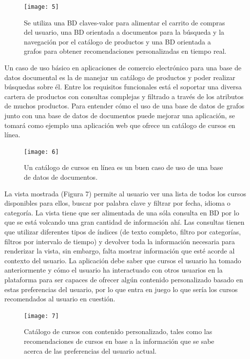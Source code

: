\documentclass[conference]{IEEEtran}
\begin{document}
\begin{figure}[!h]
\centering
\texttt{[image: 5]}
\caption{Se utiliza una BD claves-valor para alimentar el carrito de compras del usuario, una BD orientada a  documentos para la b\'usqueda y la navegaci\'on por el cat\'alogo de productos y una BD orientada a grafos para obtener recomendaciones personalizadas en tiempo real.}
\label{fig5}
\end{figure}

Un caso de uso b\'asico en aplicaciones de comercio electr\'onico para una base de datos documental es la de manejar un cat\'alogo de productos y poder realizar b\'usquedas sobre \'el. Entre los requisitos funcionales está el soportar una diversa cartera de productos con consultas complejas y filtrado a trav\'es de los atributos de muchos productos. Para entender c\'omo el uso de una base de datos de grafos  junto con una base de datos de documentos puede mejorar una aplicaci\'on, se tomar\'a como ejemplo una aplicaci\'on web que ofrece un cat\'alogo de cursos en l\'inea.

\begin{figure}[!h]
\centering
\texttt{[image: 6]}
\caption{Un cat\'alogo de cursos en l\'inea es un buen caso de uso de una base de datos de documentos.}
\label{fig6}
\end{figure}

La vista mostrada (Figura 7) permite al usuario ver una lista de todos los cursos disponibles para ellos, buscar por palabra clave y filtrar por fecha, idioma o categor\'ia. La vista tiene que ser alimentada de una s\'ola consulta en BD por lo que se est\'a volcando una gran cantidad de informaci\'on ah\'i. Las consultas tienen que utilizar diferentes tipos de \'indices (de texto completo, filtro por categor\'ias, filtros por intervalo de tiempo) y devolver toda la informaci\'on necesaria para renderizar la vista, sin embargo, falta mostrar informaci\'on que est\'e acorde al contexto del usuario. La aplicaci\'on debe saber que cursos el usuario ha tomado anteriormente y c\'omo el usuario ha interactuado con otros usuarios en la plataforma para ser capaces de ofrecer alg\'un contenido personalizado basado en estas preferencias del usuario, por lo que entra en juego lo que ser\'ia los cursos recomendados al usuario en cuesti\'on.

\begin{figure}[!h]
\centering
\texttt{[image: 7]}
\caption{Cat\'alogo de cursos con contenido personalizado, tales como las recomendaciones de cursos en base a la informaci\'on que se sabe acerca de las preferencias del usuario actual.}
\label{fig7}
\end{figure}
\end{document}
